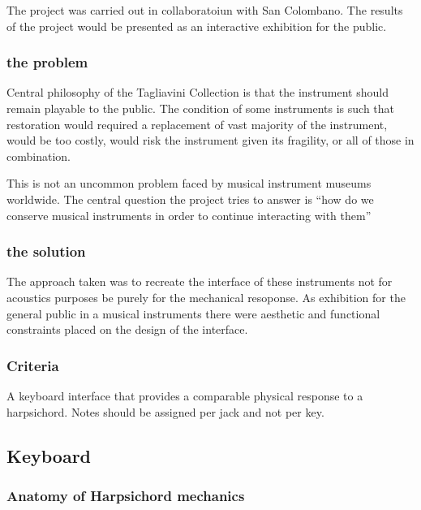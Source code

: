 The project was carried out in collaboratoiun with San Colombano. The
results of the project would be presented as an interactive exhibition
for the public.

\subsubsection{the problem}\label{the-problem}

Central philosophy of the Tagliavini Collection is that the instrument
should remain playable to the public. The condition of some instruments
is such that restoration would required a replacement of vast majority
of the instrument, would be too costly, would risk the instrument given
its fragility, or all of those in combination.

This is not an uncommon problem faced by musical instrument museums
worldwide. The central question the project tries to answer is ``how do
we conserve musical instruments in order to continue interacting with
them''

\subsubsection{the solution}\label{the-solution}

The approach taken was to recreate the interface of these instruments
not for acoustics purposes be purely for the mechanical resoponse. As
exhibition for the general public in a musical instruments there were
aesthetic and functional constraints placed on the design of the
interface.

\subsubsection{Criteria}\label{criteria}

A keyboard interface that provides a comparable physical response to a
harpsichord. Notes should be assigned per jack and not per key.

\subsection{Keyboard}\label{keyboard}

\subsubsection{Anatomy of Harpsichord
mechanics}\label{anatomy-of-harpsichord-mechanics}

